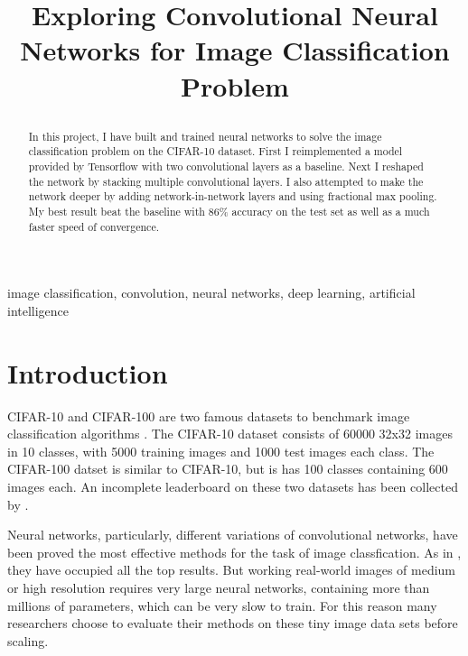\documentclass[conference]{IEEEtran}
\begin{document}
\title{Exploring Convolutional Neural Networks for Image Classification Problem \\
\author{
}
}

\maketitle

\begin{abstract}
In this project, I have built and trained neural networks to solve the image classification problem on the CIFAR-10 dataset. First I reimplemented a model provided by Tensorflow with two convolutional layers as a baseline. Next I reshaped the network by stacking multiple convolutional layers. I also attempted to make the network deeper by adding network-in-network layers and using fractional max pooling. My best result beat the baseline with 86\% accuracy on the test set as well as a much faster speed of convergence.\\   
\end{abstract}

\begin{IEEEkeywords}
image classification, convolution, neural networks, deep learning, artificial intelligence
\end{IEEEkeywords}

\section{Introduction}
CIFAR-10 and CIFAR-100 are two famous datasets to benchmark image classification algorithms \cite{cifar}. The CIFAR-10 dataset consists of 60000 32x32 images in 10 classes, with 5000 training images and 1000 test images each class. The CIFAR-100 datset is similar to CIFAR-10, but is has 100 classes containing 600 images each. An incomplete leaderboard on these two datasets has been collected by \cite{leaderboard}.

Neural networks, particularly, different variations of convolutional networks, have been proved the most effective methods for the task of image classfication. As in \cite{leaderboard}, they have occupied all the top results. But working real-world images of medium or high resolution requires very large neural networks, containing more than millions of parameters, which can be very slow to train\cite{conv}. For this reason many researchers choose to evaluate their methods on these tiny image data sets before scaling. 
\end{document}
